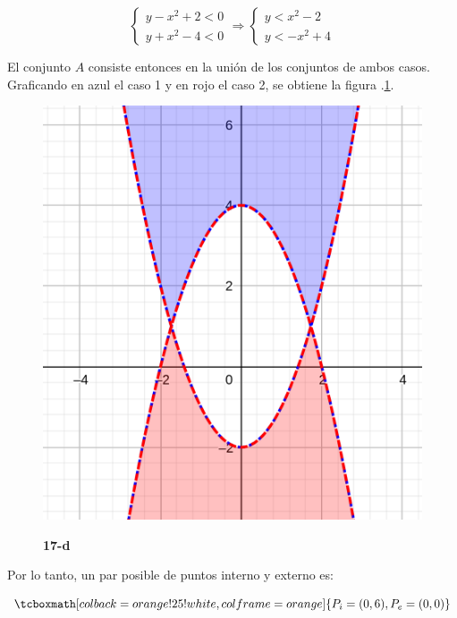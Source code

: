 \documentclass{article}
\begin{document}
\begin{enumerate}[(a)]
\begin{equation}
\left\{ \begin{array}{ll}
y - x^2 + 2 < 0 \\
y + x^2 -4 < 0
\end{array}
\right. \Rightarrow \left\{ \begin{array}{ll}
y < x^2 - 2 \\
y < -x^2 + 4
\end{array}
\right.
\end{equation}

El conjunto $A$ consiste entonces en la unión de los conjuntos de ambos casos. Graficando en azul el caso 1 y en rojo el caso 2, se obtiene la figura .\ref{fig:1-17-d}.

\begin{figure}[ht]
\caption{\textbf{17-d}}
\includegraphics[scale=1]{img/ejercicios/1/17-d.png} 
\centering
\label{fig:1-17-d}
\end{figure}

Por lo tanto, un par posible de puntos interno y externo es:

\begin{equation}
\tcboxmath[colback=orange!25!white,colframe=orange]
{
P_i = (0, 6), P_e = (0, 0)
}
\end{equation}


\end{enumerate}
\end{document}
